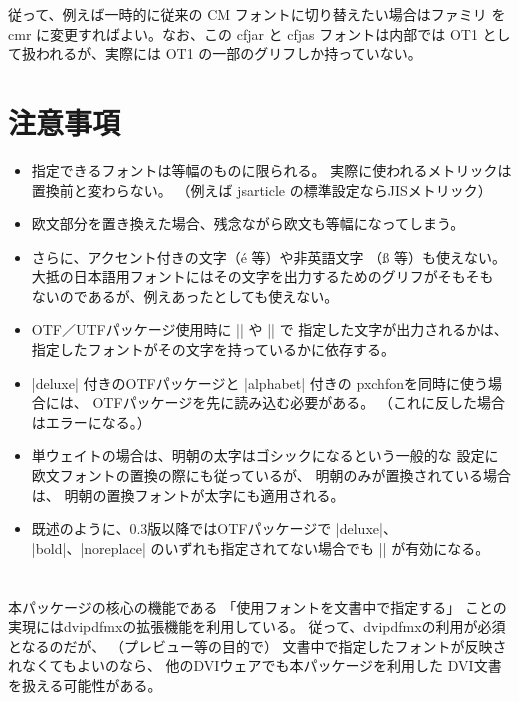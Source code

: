 \documentclass[a4paper,uplatex]{jsarticle}
\newcommand{\Pkg}[1]{\textsf{#1}}
\begin{document}
従って、例えば一時的に従来の CM フォントに切り替えたい場合はファミリ
を cmr に変更すればよい。なお、この cfjar と cfjas フォントは内部では
OT1 として扱われるが、実際には OT1 の一部のグリフしか持っていない。

\section{注意事項}

\begin{itemize}
\item 指定できるフォントは等幅のものに限られる。
  実際に使われるメトリックは置換前と変わらない。
  （例えば jsarticle の標準設定ならJISメトリック）
\item 欧文部分を置き換えた場合、残念ながら欧文も等幅になってしまう。
\item さらに、アクセント付きの文字（\'e 等）や非英語文字
  （{\ss} 等）も使えない。
  大抵の日本語用フォントにはその文字を出力するためのグリフがそもそも
  ないのであるが、例えあったとしても使えない。
\item \Pkg{OTF}／\Pkg{UTF}パッケージ使用時に |\UTF| や |\CID| で
  指定した文字が出力されるかは、
  指定したフォントがその文字を持っているかに依存する。
\item |deluxe| 付きの\Pkg{OTF}パッケージと |alphabet| 付きの
  \Pkg{pxchfon}を同時に使う場合には、
  \Pkg{OTF}パッケージを先に読み込む必要がある。
  （これに反した場合はエラーになる。）
\item 単ウェイトの場合は、明朝の太字はゴシックになるという一般的な
  設定に欧文フォントの置換の際にも従っているが、
  明朝のみが置換されている場合は、
  明朝の置換フォントが太字にも適用される。
\item 既述のように、0.3版以降では\Pkg{OTF}パッケージで |deluxe|、
  |bold|、|noreplace| のいずれも指定されてない場合でも |\setgothicfont|
  が有効になる。
\end{itemize}

\appendix
\section{}

本パッケージの核心の機能である
「使用フォントを文書中で指定する」
ことの実現にはdvipdfmxの拡張機能を利用している。
従って、dvipdfmxの利用が必須となるのだが、
（プレビュー等の目的で）
文書中で指定したフォントが反映されなくてもよいのなら、
他のDVIウェアでも本パッケージを利用した
DVI文書を扱える可能性がある。
\end{document}

